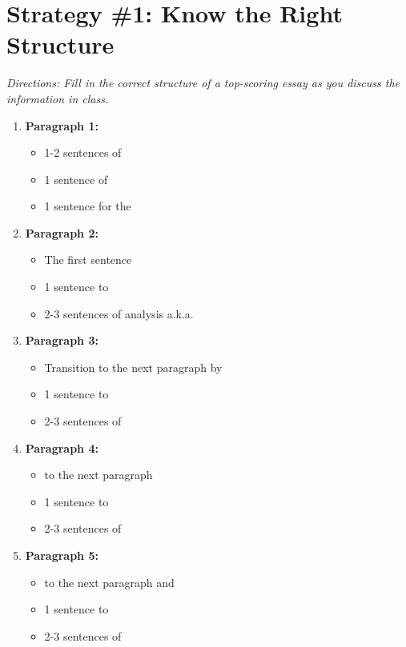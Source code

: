 \section{Strategy \#1: Know the Right Structure}

\textit{Directions: Fill in the correct structure of a top-scoring essay as you discuss the information in class.}

\begin{spacing}{1.5}
\begin{enumerate}
\item \textbf{Paragraph 1:} \hrulefill

\begin{itemize}
\item 1-2 sentences of \hrulefill
\item 1 sentence of \hrulefill
\item 1 sentence for the \hrulefill
\end{itemize}

\item \textbf{Paragraph 2:} \hrulefill

\begin{itemize}
\item The first sentence \hrulefill
\item 1 sentence to \hrulefill
\item 2-3 sentences of analysis a.k.a. \hrulefill
\end{itemize}

\item \textbf{Paragraph 3:} \hrulefill

\begin{itemize}
\item Transition to the next paragraph by \hrulefill
\item 1 sentence to \hrulefill
\item 2-3 sentences of \hrulefill
\end{itemize}

\item \textbf{Paragraph 4:} \hrulefill

\begin{itemize}
\item \underline{\hspace{2in}} to the next paragraph 
\item 1 sentence to \hrulefill
\item 2-3 sentences of \hrulefill
\end{itemize}

\item \textbf{Paragraph 5:} \hrulefill

\begin{itemize}
\item \underline{\hspace{2in}} to the next paragraph and \hrulefill
\item 1 sentence to \hrulefill
\item 2-3 sentences of \hrulefill
\end{itemize}
\end{enumerate}
\end{spacing}